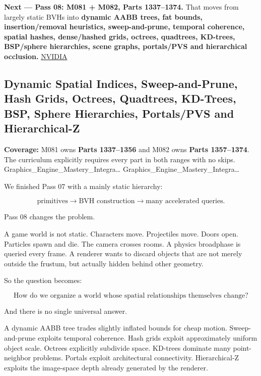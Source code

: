 \textbf{Next --- Pass 08: M081 + M082, Parts 1337--1374.} That moves from largely static BVHs into \textbf{dynamic AABB trees, fat bounds, insertion/removal heuristics, sweep-and-prune, temporal coherence, spatial hashes, dense/hashed grids, octrees, quadtrees, KD-trees, BSP/sphere hierarchies, scene graphs, portals/PVS and hierarchical occlusion.} \href{https://research.nvidia.com/publication/2012-06_maximizing-parallelism-construction-bvhs-octrees-and-k-d-trees?utm_source=chatgpt.com}{NVIDIA}

\subsection{Dynamic Spatial Indices, Sweep-and-Prune, Hash Grids, Octrees, Quadtrees, KD-Trees, BSP, Sphere Hierarchies, Portals/PVS and Hierarchical-Z}\label{06-engine-ii-ch028-dynamic-spatial-indices-sweep-and-prune-hash-grids-octrees-quadtrees-kd-trees-bsp-sphere-hierarchies-portalspvs-and-hierarchical-z}

\hypertarget{06-engine-ii-ch028-dynamic-spatial-indices-sweep-and-prune-hash-grids-octrees-quadtrees-kd-trees-bsp-sphere-hierarchies-portalspvs-and-hierarchical-z}{}

\textbf{Coverage:} M081 owns \textbf{Parts 1337--1356} and M082 owns \textbf{Parts 1357--1374}. The curriculum explicitly requires every part in both ranges with no skips. Graphics\_Engine\_Mastery\_Integra\ldots{} Graphics\_Engine\_Mastery\_Integra\ldots{}

We finished Pass 07 with a mainly static hierarchy:

\[
\text{primitives}
\rightarrow
\text{BVH construction}
\rightarrow
\text{many accelerated queries}.
\]

Pass 08 changes the problem.

A game world is not static. Characters move. Projectiles move. Doors open. Particles spawn and die. The camera crosses rooms. A physics broadphase is queried every frame. A renderer wants to discard objects that are not merely outside the frustum, but actually hidden behind other geometry.

So the question becomes:

\[
\boxed{
\text{How do we organize a world whose spatial relationships themselves change?}
}
\]

And there is no single universal answer.

A dynamic AABB tree trades slightly inflated bounds for cheap motion. Sweep-and-prune exploits temporal coherence. Hash grids exploit approximately uniform object scale. Octrees explicitly subdivide space. KD-trees dominate many point-neighbor problems. Portals exploit architectural connectivity. Hierarchical-Z exploits the image-space depth already generated by the renderer.

